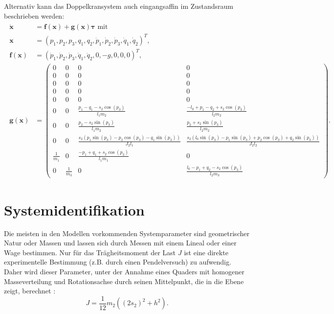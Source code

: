 Alternativ kann das Doppelkransystem auch eingangsaffin im Zustandsraum beschrieben werden:
\begin{align}
\label{eq:state_space_double_crane}
\begin{split}
\dot{\mathbf{x}} &= \mathbf{f}(\mathbf{x}) + \mathbf{g}(\mathbf{x}) \boldsymbol{\tau} \text{ mit } \\ 
\mathbf{x} &= (p_{1},	p_{2}, p_{3}, q_{1}, q_{2}, \dot{p}_{1}, \dot{p}_{2}, \dot{p}_{3}, \dot{q}_{1}, \dot{q}_{2})^T, \\
\mathbf{f}(\mathbf{x}) &= 
(\dot{p}_{1}, \dot{p}_{2}, \dot{p}_{3}, \dot{q}_{1}, \dot{q}_{2}, 0, -g, 0, 0, 0)^T, \\ 
\mathbf{g}(\mathbf{x}) &=
\left(\begin{smallmatrix}
0 & 0 & 0 & 0\\
0 & 0 & 0 & 0\\
0 & 0 & 0 & 0\\
0 & 0 & 0 & 0\\
0 & 0 & 0 & 0\\
0 & 0 & \frac{p_{1} - q_{1} - s_{2} \cos{\left(p_{3} \right)}}{l_{1} m_{2}} & \frac{- l_{0} + p_{1} - q_{2} + s_{2} \cos{\left(p_{3} \right)}}{l_{2} m_{2}}\\
0 & 0 & \frac{p_{2} - s_{2} \sin{\left(p_{3} \right)}}{l_{1} m_{2}} & \frac{p_{2} + s_{2} \sin{\left(p_{3} \right)}}{l_{2} m_{2}}\\
0 & 0 & \frac{s_{2} \left(p_{1} \sin{\left(p_{3} \right)} - p_{2} \cos{\left(p_{3} \right)} - q_{1} \sin{\left(p_{3} \right)}\right)}{J_{2} l_{1}} & \frac{s_{2} \left(l_{0} \sin{\left(p_{3} \right)} - p_{1} \sin{\left(p_{3} \right)} + p_{2} \cos{\left(p_{3} \right)} + q_{2} \sin{\left(p_{3} \right)}\right)}{J_{2} l_{2}}\\
\frac{1}{m_{1}} & 0 & \frac{- p_{1} + q_{1} + s_{2} \cos{\left(p_{3} \right)}}{l_{1} m_{1}} & 0\\
0 & \frac{1}{m_{3}} & 0 & \frac{l_{0} - p_{1} + q_{2} - s_{2} \cos{\left(p_{3} \right)}}{l_{2} m_{3}}
\end{smallmatrix}\right).
\end{split}
\end{align}

\section{Systemidentifikation}
\label{sec:SysIdent}

Die meisten in den Modellen vorkommenden Systemparameter sind geometrischer Natur oder Massen und lassen sich durch Messen mit einem Lineal oder einer Wage bestimmen. Nur für das Trägheitsmoment der Last $J$ ist eine direkte experimentelle Bestimmung (z.B. durch einen Pendelversuch) zu aufwendig. Daher wird dieser Parameter, unter der Annahme eines Quaders mit homogener Masseverteilung und Rotationsachse durch seinen Mittelpunkt, die in die Ebene zeigt, berechnet \cite{LastTraegheit}:
\begin{equation}
	J = \frac{1}{12} m_2 ((2 s_2)^2 + h^2).
\end{equation}

